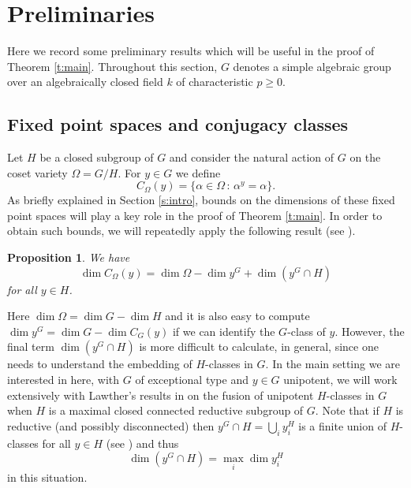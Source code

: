 \documentclass[twoside,a4paper,reqno,11pt]{amsart}
\renewcommand{\a}{\alpha}
\renewcommand{\O}{\Omega}
\newcommand{\<}{\langle}
\renewcommand{\>}{\rangle}
\newcommand{\geqs}{\geqslant}
\renewcommand{\:}{\colon}
\theoremstyle{plain}
\newtheorem{prop}[thm]{Proposition}
\theoremstyle{definition}
\begin{document}
\section{Preliminaries}\label{s:prel}

Here we record some preliminary results which will be useful in the proof of Theorem \ref{t:main}. Throughout this section, $G$ denotes a simple algebraic group over an algebraically closed field $k$ of characteristic $p \geqs 0$.

\subsection{Fixed point spaces and conjugacy classes}\label{ss:fix}

Let $H$ be a closed subgroup of $G$ and consider the natural action of $G$ on the coset variety $\O = G/H$. For $y \in G$ we define
\[
C_{\O}(y) = \{ \a \in \O \,:\, \a^y = \a\}.
\]
As briefly explained in Section \ref{s:intro}, bounds on the dimensions of these fixed point spaces will play a key role in the proof of Theorem \ref{t:main}. In order to obtain such bounds, we will repeatedly apply the following result (see  \cite[Proposition 1.14]{LLS1}). 

\begin{prop}\label{p:dim}
We have 
\[
\dim C_{\O}(y) = \dim \O - \dim y^G + \dim(y^G \cap H)
\] 
for all $y \in H$.
\end{prop}

Here $\dim \O = \dim G - \dim H$ and it is also easy to compute $\dim y^G = \dim G - \dim C_G(y)$ if we can identify the $G$-class of $y$. However, the final term $\dim(y^G\cap H)$ is more difficult to calculate, in general, since one needs to understand the embedding of $H$-classes in $G$. In the main setting we are interested in here, with $G$ of exceptional type and $y \in G$ unipotent, we will work extensively with Lawther's results in \cite{Law2} on the fusion of unipotent $H$-classes in $G$ when $H$ is a maximal closed connected reductive subgroup of $G$. Note that if $H$ is reductive (and possibly disconnected) then $y^G \cap H = \bigcup_i y_i^H$ is a finite union of $H$-classes for all $y \in H$ (see \cite{Gur}) and thus 
\[
\dim(y^G \cap H) = \max_i \dim y_i^H
\] 
in this situation.
\end{document}
